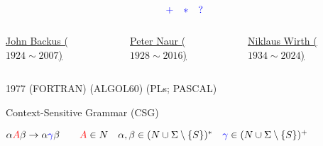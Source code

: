 \begin{frame}{}
  

  \begin{columns}
      \pause
      
      \pause
      
  \end{columns}
\end{frame}

\begin{frame}{}
\end{frame}

\begin{frame}{}
  \begin{center}
    \href{https://en.wikipedia.org/wiki/Extended\_Backus\%E2\%80\%93Naur\_form}{}
    \[
      \textcolor{blue}{+ \quad \ast \quad ?}
    \]
  \end{center}

  \begin{columns}
      \begin{center}
        \href{https://en.wikipedia.org/wiki/John_Backus}{John Backus ($1924 \sim 2007$)}
      \end{center}
      \begin{center}
        \href{https://en.wikipedia.org/wiki/Peter_Naur}{Peter Naur ($1928 \sim 2016$)}
      \end{center}
      \begin{center}
        \href{https://en.wikipedia.org/wiki/Niklaus_Wirth}{Niklaus Wirth ($1934 \sim 2024$)}
      \end{center}
  \end{columns}

  \pause
  \begin{center}
    1977 (FORTRAN)  (ALGOL60)  (PLs; PASCAL)
  \end{center}
\end{frame}

\begin{frame}{}
  \begin{center}
    Context-Sensitive Grammar (CSG)
    

    $\alpha \textcolor{red}{A} \beta \to \alpha \textcolor{blue}{\gamma} \beta
      \qquad \textcolor{red}{A} \in N \quad \alpha, \beta \in (N \cup \Sigma \setminus \{S\})^{\ast}
        \quad \textcolor{blue}{\gamma} \in (N \cup \Sigma \setminus \{S\})^{+}$
  \end{center}
\end{frame}

